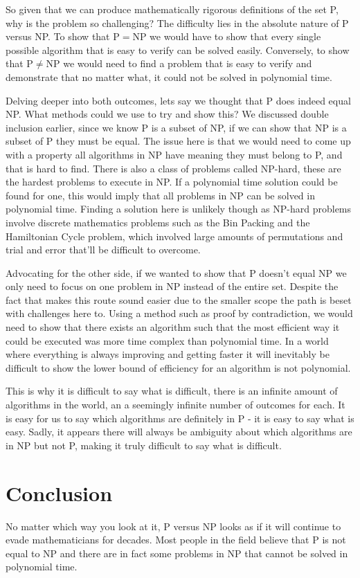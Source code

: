 \documentclass[twoside,10pt]{article}
\begin{document}
So given that we can produce mathematically rigorous definitions of the set P, why is the problem so challenging? The difficulty lies in the absolute nature of P versus NP. To show that P$=$NP we would have to show that every single possible algorithm that is easy to verify can be solved easily. Conversely, to show that P$\neq$NP we would need to find a problem that is easy to verify and demonstrate that no matter what, it could not be solved in polynomial time.

Delving deeper into both outcomes, lets say we thought that P does indeed equal NP. What methods could we use to try and show this? We discussed double inclusion earlier, since we know P is a subset of NP, if we can show that NP is a subset of P they must be equal. The issue here is that we would need to come up with a property all algorithms in NP have meaning they must belong to P, and that is hard to find. There is also a class of problems called NP-hard, these are the hardest problems to execute in NP. If a polynomial time solution could be found for one, this would imply that all problems in NP can be solved in polynomial time. Finding a solution here is unlikely though as NP-hard problems involve discrete mathematics problems such as the Bin Packing and the Hamiltonian Cycle problem, which involved large amounts of permutations and trial and error that'll be difficult to overcome.

Advocating for the other side, if we wanted to show that P doesn't equal NP we only need to focus on one problem in NP instead of the entire set. Despite the fact that makes this route sound easier due to the smaller scope the path is beset with challenges here to. Using a method such as proof by contradiction, we would need to show that there exists an algorithm such that the most efficient way it could be executed was more time complex than polynomial time. In a world where everything is always improving and getting faster it will inevitably be difficult to show the lower bound of efficiency for an algorithm is not polynomial.

This is why it is difficult to say what is difficult, there is an infinite amount of algorithms in the world, an a seemingly infinite number of outcomes for each. It is easy for us to say which algorithms are definitely in P - it is easy to say what is easy. Sadly, it appears there will always be ambiguity about which algorithms are in NP but not P, making it truly difficult to say what is difficult.

\section{Conclusion}
No matter which way you look at it, P versus NP looks as if it will continue to evade mathematicians for decades. Most people in the field believe that P is not equal to NP and there are in fact some problems in NP that cannot be solved in polynomial time. 
\end{document}
